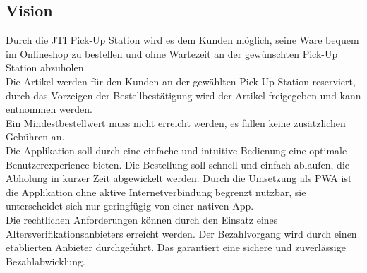 \subsection{Vision}
Durch die JTI Pick-Up Station wird es dem Kunden möglich, seine Ware bequem im Onlineshop zu bestellen und ohne Wartezeit an der gewünschten Pick-Up Station abzuholen. \\
Die Artikel werden für den Kunden an der gewählten Pick-Up Station reserviert, durch das Vorzeigen der Bestellbestätigung wird der Artikel freigegeben und kann entnommen werden. \\ 
Ein Mindestbestellwert muss nicht erreicht werden, es fallen keine zusätzlichen Gebühren an.  \\
Die Applikation soll durch eine einfache und intuitive Bedienung eine optimale Benutzerexperience bieten. Die Bestellung soll schnell und einfach ablaufen, die Abholung in kurzer Zeit abgewickelt werden. Durch die Umsetzung als \gls{PWA} ist die Applikation ohne aktive Internetverbindung begrenzt nutzbar, sie unterscheidet sich nur geringfügig von einer nativen App. \\
Die rechtlichen Anforderungen können durch den Einsatz eines Altersverifikationsanbieters erreicht werden. Der Bezahlvorgang wird durch einen etablierten Anbieter durchgeführt. Das garantiert eine sichere und zuverlässige Bezahlabwicklung. 

\newpage